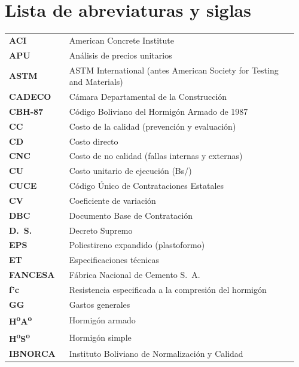 \chapter*{Lista de abreviaturas y siglas}
\begingroup{}
\begin{longtable}{@{}P{0.20\linewidth}P{0.76\linewidth}@{}}
\textbf{ACI}     & American Concrete Institute \\
\textbf{APU}     & Análisis de precios unitarios \\
\textbf{ASTM}    & ASTM International (antes American Society for Testing and Materials) \\
\textbf{CADECO}  & Cámara Departamental de la Construcción \\
\textbf{CBH-87}  & Código Boliviano del Hormigón Armado de 1987 \\
\textbf{CC}      & Costo de la calidad (prevención y evaluación) \\
\textbf{CD}      & Costo directo \\
\textbf{CNC}     & Costo de no calidad (fallas internas y externas) \\
\textbf{CU}      & Costo unitario de ejecución (Bs/\mdos{}) \\
\textbf{CUCE}    & Código Único de Contrataciones Estatales \\
\textbf{CV}      & Coeficiente de variación \\
\textbf{DBC}     & Documento Base de Contratación \\
\textbf{D.~S.}   & Decreto Supremo \\
\textbf{EPS}     & Poliestireno expandido (plastoformo) \\
\textbf{ET}      & Especificaciones técnicas \\
\textbf{FANCESA} & Fábrica Nacional de Cemento S.~A. \\
\textbf{f'c}     & Resistencia especificada a la compresión del hormigón \\
\textbf{GG}      & Gastos generales \\
\textbf{H\textsuperscript{o}A\textsuperscript{o}} & Hormigón armado \\
\textbf{H\textsuperscript{o}S\textsuperscript{o}} & Hormigón simple \\
\textbf{IBNORCA} & Instituto Boliviano de Normalización y Calidad \\

\end{longtable}
